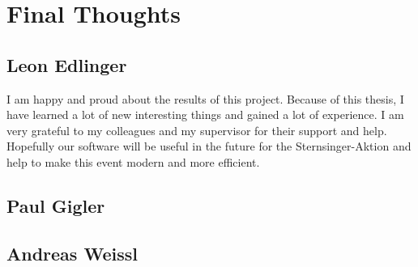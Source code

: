 \section{Final Thoughts}

\subsection{Leon Edlinger}
I am happy and proud about the results of this project. Because of this thesis, I have learned a lot of new interesting things and gained a lot of experience. I am very grateful to my colleagues and my supervisor for their support and help. Hopefully our software will be useful in the future for the Sternsinger-Aktion and help to make this event modern and more efficient.

\subsection{Paul Gigler}

\subsection{Andreas Weissl}